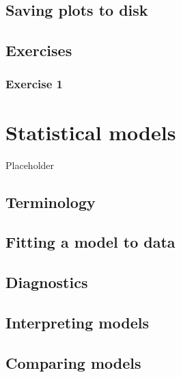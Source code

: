 \documentclass[]{gitbook}
\begin{document}
\hypertarget{saving-plots-to-disk}{%
\subsection{Saving plots to disk}\label{saving-plots-to-disk}}

\hypertarget{exercises-2}{%
\subsection{Exercises}\label{exercises-2}}

\hypertarget{exercise-1-2}{%
\subsubsection*{Exercise 1}\label{exercise-1-2}}

\hypertarget{statistical-models}{%
\section{Statistical models}\label{statistical-models}}

Placeholder

\hypertarget{terminology}{%
\subsection{Terminology}\label{terminology}}

\hypertarget{fitting-a-model-to-data}{%
\subsection{Fitting a model to data}\label{fitting-a-model-to-data}}

\hypertarget{diagnostics}{%
\subsection{Diagnostics}\label{diagnostics}}

\hypertarget{interpreting-models}{%
\subsection{Interpreting models}\label{interpreting-models}}

\hypertarget{comparing-models}{%
\subsection{Comparing models}\label{comparing-models}}
\end{document}
